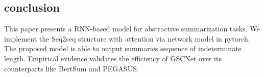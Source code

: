 \documentclass[conference]{IEEEtran}
\begin{document}
\subsection{conclusion}
This paper presents a RNN-based model for abstractive summarization tasks. We implement the Seq2seq structure with attention via network model in pytorch. The proposed model is able to output summaries sequence of indeterminate length. Empirical evidence validates the efficiency of
GSCNet over its counterparts like BertSum and PEGASUS.   



\end{document}
